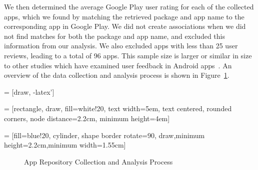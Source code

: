 \documentclass{sig-alternate-05-2015}
\begin{document}
We then determined the average Google Play user rating for each of the collected apps, which we found by matching the retrieved package and app name to the corresponding app in Google Play. We did not create associations when we did not find matches for both the package and app name, and excluded this information from our analysis. We also excluded apps with less than 25 user reviews, leading to a total of 96 apps. This sample size is larger or similar in size to other studies which have examined user feedback in Android apps~\cite{Khalid:2014:PDT:2635868.2635909, Gui:2015:TAH:2818754.2818769}. An overview of the data collection and analysis process is shown in Figure~\ref{fig:analysisprocess}.


     = [draw, -latex']

     = [rectangle, draw, fill=white!20,
    text width=5em, text centered, rounded corners, node distance=2.2cm, minimum height=4em]

	= [fill=blue!20, cylinder, shape border rotate=90, draw,minimum height=2.2cm,minimum width=1.55cm]

	\begin{figure}[h!]
	\begin{center}
    \resizebox{.45\textwidth}{!}{
	\begin{tikzpicture}[node distance = 2cm, auto,   hhilit/.style={draw=black, thick, densely dotted,label=oSARA Tool,inner xsep=.3em,inner ysep=.7em},]
     		\node [database] (init) {F-Droid};
     		\node [block, right of=init] (jar) {Collect Repositories};
     		\node [block, right of=jar] (java) {Analyze Repositories};
     		\node [block, right of=java] (R) {Data Analysis};


   \node[hhilit, fit=(java) (R)] {};



            \path [line] (init) -- node {}(jar);
     		\path [line] (jar) -- node {}(java);
     		\path [line] (java) -- node {}(R);

	\end{tikzpicture}
}
	\end{center}
	\caption{App Repository Collection and Analysis Process}
	\label{fig:analysisprocess}
	\end{figure}
\end{document}
